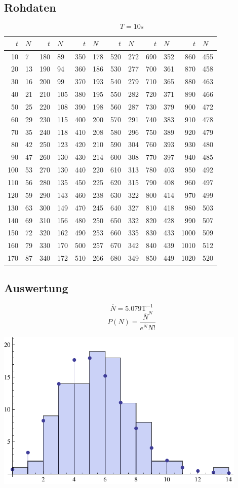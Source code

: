\documentclass[12pt,a4paper]{article}
\begin{document}
\subsection*{Rohdaten}
\[ T = 10 \mbox{s} \]
\begin{tabular}{|r|l|r|l|r|l|r|l|r|l|r|l|}
\hline
$t$&$N$&$t$&$N$&$t$&$N$&$t$&$N$&$t$&$N$&$t$&$N$\\
\hline
10&7&180&89&350&178&520&272&690&352&860&455\\
20&13&190&94&360&186&530&277&700&361&870&458\\
30&16&200&99&370&193&540&279&710&365&880&463\\
40&21&210&105&380&195&550&282&720&371&890&466\\
50&25&220&108&390&198&560&287&730&379&900&472\\
60&29&230&115&400&200&570&291&740&383&910&478\\
70&35&240&118&410&208&580&296&750&389&920&479\\
80&42&250&123&420&210&590&304&760&393&930&480\\
90&47&260&130&430&214&600&308&770&397&940&485\\
100&53&270&130&440&220&610&313&780&403&950&492\\
110&56&280&135&450&225&620&315&790&408&960&497\\
120&59&290&143&460&238&630&322&800&414&970&499\\
130&63&300&149&470&245&640&327&810&418&980&503\\
140&69&310&156&480&250&650&332&820&428&990&507\\
150&72&320&162&490&253&660&335&830&433&1000&509\\
160&79&330&170&500&257&670&342&840&439&1010&512\\
170&87&340&172&510&266&680&349&850&449&1020&520\\
\hline
\end{tabular}

\subsection*{Auswertung}
\[ \overline{N} = 5.079 \mbox{T}^{-1} \]
\[ P(N) = \frac{\overline{N}^N}{e^{\overline{N}}N!} \]
\begin{center}
\includegraphics[width=12cm]{diagram2.pdf}
\end{center}
\end{document}
